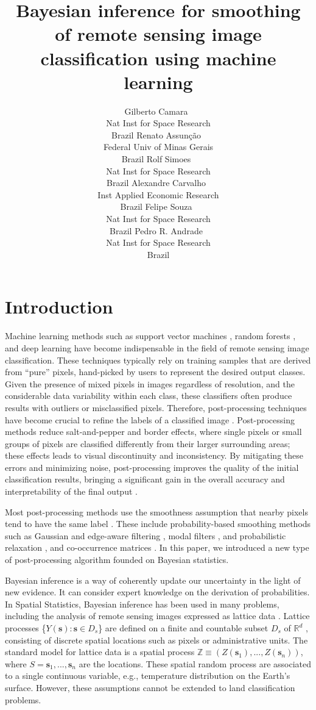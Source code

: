 \documentclass[
  shortnames]{jss}
\author{
Gilberto Camara~\orcidlink{0000-0002-3681-487X}\\Nat Inst for Space Research\\
Brazil \And Renato Assunção~\orcidlink{0000-0001-7442-9166}\\Federal Univ of Minas Gerais\\
Brazil \And Rolf Simoes~\orcidlink{0000-0003-0953-4132}\\Nat Inst for Space Research\\
Brazil \AND Alexandre Carvalho~\orcidlink{0000-0001-8762-5465}\\Inst Applied Economic Research\\
Brazil \And Felipe Souza~\orcidlink{0000-XXXXX}\\Nat Inst for Space Research\\
Brazil \And Pedro R. Andrade~\orcidlink{0000-0001-8675-4046}\\Nat Inst for Space Research\\
Brazil
}
\title{Bayesian inference for smoothing of remote sensing image classification using machine learning}
\begin{document}
\newpage

\hypertarget{introduction}{%
\section{Introduction}\label{introduction}}

Machine learning methods such as support vector machines \citep{Mountrakis2011}, random forests \citep{Belgiu2016}, and deep learning \citep{Ma2019} have become indispensable in the field of remote sensing image classification. These techniques typically rely on training samples that are derived from ``pure'' pixels, hand-picked by users to represent the desired output classes. Given the presence of mixed pixels in images regardless of resolution, and the considerable data variability within each class, these classifiers often produce results with outliers or misclassified pixels. Therefore, post-processing techniques have become crucial to refine the labels of a classified image \citep{Huang2014}. Post-processing methods reduce salt-and-pepper and border effects, where single pixels or small groups of pixels are classified differently from their larger surrounding areas; these effects leads to visual discontinuity and inconsistency. By mitigating these errors and minimizing noise, post-processing improves the quality of the initial classification results, bringing a significant gain in the overall accuracy and interpretability of the final output \citep{Schindler2012}.

Most post-processing methods use the smoothness assumption that nearby pixels tend to have the same label \citep{Schindler2012}. These include probability-based smoothing methods such as Gaussian and edge-aware filtering \citep{Schindler2012}, modal filters \citep{Ghimire2010}, and probabilistic relaxation \citep{Gong1989}, and co-occurrence matrices \citep{Huang2014}. In this paper, we introduced a new type of post-processing algorithm founded on Bayesian statistics.

Bayesian inference is a way of coherently update our uncertainty in the light of new evidence. It can consider expert knowledge on the derivation of probabilities. In Spatial Statistics, Bayesian inference has been used in many problems, including the analysis of remote sensing images expressed as lattice data \citep{Marshall1991, Besag1991, Bivand2013}. Lattice processes \{\(Y(\mathbf{s}): \mathbf{s} \in D_s\)\} are defined on a finite and countable subset \(D_s\) of \(\mathbb{R}^d\) \citep{Cressie2011}, consisting of discrete spatial locations such as pixels or administrative units. The standard model for lattice data is a spatial process \(\mathbb{Z} \equiv (Z(\mathbf{s}_1), ..., Z(\mathbf{s}_n))\), where \(S = {\mathbf{s}_1, ..., \mathbf{s}_n}\) are the locations. These spatial random process are associated to a single continuous variable, e.g., temperature distribution on the Earth's surface. However, these assumptions cannot be extended to land classification problems.
\end{document}
